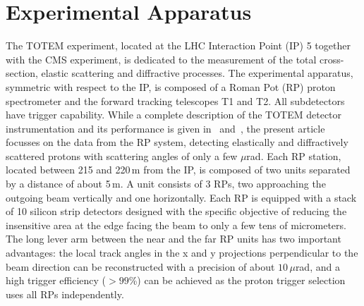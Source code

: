 \section{Experimental Apparatus}
%
The TOTEM experiment, located at the LHC Interaction Point (IP) 5 together with
the CMS experiment, is dedicated to the measurement of the total 
cross-section, elastic scattering
and diffractive processes. The experimental
apparatus, symmetric with respect to the IP, is 
composed of a Roman Pot (RP) proton spectrometer and the forward tracking 
telescopes T1 and T2. All subdetectors have trigger capability. 
While a complete description of the TOTEM detector instrumentation 
and its performance is given in~\cite{totem-jinst} and~\cite{totem-ijmp}, 
the present article focusses on the data from the RP system, detecting 
elastically and diffractively scattered protons with
scattering angles of only a few $\mu$rad. 
Each RP station, located between 215 and 220\,m from the IP, is composed of two 
units separated
by a distance of about 5\,m. A unit consists of 3 RPs, two
approaching the outgoing beam vertically and one horizontally.
Each RP is equipped with a stack of 10 silicon
strip detectors designed with the specific objective of
reducing the insensitive area at the edge facing the beam
to only a few tens of micrometers. The long lever arm
between the near and the far RP units has two important
advantages: the local track angles in the x and y projections
perpendicular to the beam direction can be reconstructed
with a precision of about $10\,\mu$rad, and a high trigger efficiency
($> 99$\%) can be achieved as the proton trigger selection
uses all RPs independently.

